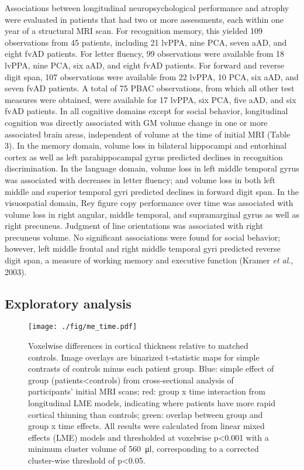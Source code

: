 \documentclass[]{article}
\begin{document}
Associations between longitudinal neuropsychological performance and
atrophy were evaluated in patients that had two or more assessments,
each within one year of a structural MRI scan. For recognition memory,
this yielded 109 observations from 45 patients, including 21 lvPPA, nine
PCA, seven aAD, and eight fvAD patients. For letter fluency, 99
observations were available from 18 lvPPA, nine PCA, six aAD, and eight
fvAD patients. For forward and reverse digit span, 107 observations were
available from 22 lvPPA, 10 PCA, six aAD, and seven fvAD patients. A
total of 75 PBAC observations, from which all other test measures were
obtained, were available for 17 lvPPA, six PCA, five aAD, and six fvAD
patients. In all cognitive domains except for social behavior,
longitudinal cognition was directly associated with GM volume change in
one or more associated brain areas, independent of volume at the time of
initial MRI (Table 3). In the memory domain, volume loss in bilateral
hippocampi and entorhinal cortex as well as left parahippocampal gyrus
predicted declines in recognition discrimination. In the language
domain, volume loss in left middle temporal gyrus was associated with
decreases in letter fluency; and volume loss in both left middle and
superior temporal gyri predicted declines in forward digit span. In the
visuospatial domain, Rey figure copy performance over time was
associated with volume loss in right angular, middle temporal, and
supramarginal gyrus as well as right precuneus. Judgment of line
orientations was associated with right precuneus volume. No significant
associations were found for social behavior; however, left middle
frontal and right middle temporal gyri predicted reverse digit span, a
measure of working memory and executive function (Kramer \emph{et al.},
2003).

\subsection*{Exploratory analysis}\label{exploratory-analysis}

\begin{figure}[]

{\centering \texttt{[image: ./fig/me\_time.pdf]} 

}

\caption[GM time effects]{Voxelwise differences in cortical thickness relative to matched controls. Image overlays are binarized t-statistic maps for simple contrasts of controls minus each patient group. Blue: simple effect of group (patients<controls) from cross-sectional analysis of participants' initial MRI scans; red: group x time interaction from longitudinal LME models, indicating where patients have more rapid cortical thinning than controls; green: overlap between group and group x time effects. All results were calculated from linear mixed effects (LME) models and thresholded at voxelwise p<0.001 with a minimum cluster volume of \SI{560}{\micro\litre}, corresponding to a corrected cluster-wise threshold of p<0.05. \label{gm_me_time}}

\end{figure}
\end{document}

